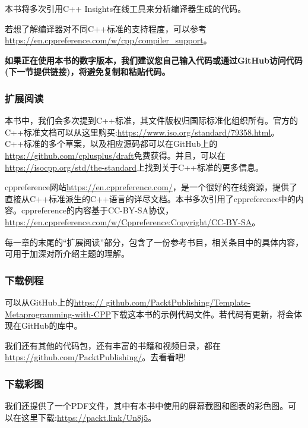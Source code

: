 本书将多次引用C++ Insights在线工具来分析编译器生成的代码。

若想了解编译器对不同C++标准的支持程度，可以参考\url{https://en.cppreference.com/w/cpp/compiler\_support}。

\textbf{
如果正在使用本书的数字版本，我们建议您自己输入代码或通过GitHub访问代码(下一节提供链接)，将避免复制和粘贴代码。
}

\subsubsection{扩展阅读}

本书中，我们会多次提到C++标准，其文件版权归国际标准化组织所有。官方的C++标准文档可以从这里购买:\url{https://www.iso.org/standard/79358.html}。C++标准的多个草案，以及相应源码都可以在GitHub上的\url{https://github.com/cplusplus/draft}免费获得。并且，可以在\url{https://isocpp.org/std/the-standard}上找到关于C++标准的更多信息。

cppreference网站\url{https://en.cppreference.com/}，是一个很好的在线资源，提供了直接从C++标准派生的C++语言的详尽文档。本书多次引用了cppreference中的内容。cppreference的内容基于CC-BY-SA协议，\url{https://en.cppreference.com/w/Cppreference:Copyright/CC-BY-SA}。

每一章的末尾的“扩展阅读”部分，包含了一份参考书目，相关条目中的具体内容，可用于加深对所介绍主题的理解。

\subsubsection{下载例程}

可以从GitHub上的\url{https:// github.com/PacktPublishing/Template-Metaprogramming-with-CPP}下载这本书的示例代码文件。若代码有更新，将会体现在GitHub的库中。

我们还有其他的代码包，还有丰富的书籍和视频目录，都在\url{https://github.com/PacktPublishing/}。去看看吧!


\subsubsection{下载彩图}

我们还提供了一个PDF文件，其中有本书中使用的屏幕截图和图表的彩色图。可以在这里下载:\url{https://packt.link/Un8j5}。








